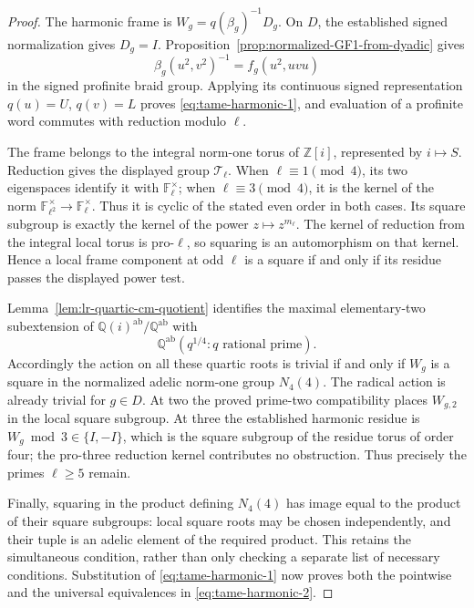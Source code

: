 \begin{proof}
The harmonic frame is $W_g=q(\beta_g)^{-1}D_g$.
On $D$, the established signed normalization gives $D_g=I$.
Proposition~\ref{prop:normalized-GF1-from-dyadic} gives
\[
 \beta_g(u^2,v^2)^{-1}=f_g(u^2,uvu)
\]
in the signed profinite braid group. Applying its continuous
signed representation $q(u)=U$, $q(v)=L$ proves \eqref{eq:tame-harmonic-1}, and
evaluation of a profinite word commutes with reduction modulo
$\ell$.

The frame belongs to the integral norm-one torus of
$\mathbb Z[i]$, represented by $i\mapsto S$.
Reduction gives the displayed group $\mathcal T_\ell$.
When $\ell\equiv1\pmod4$, its two eigenspaces identify it
with $\mathbb F_\ell^\times$; when $\ell\equiv3\pmod4$,
it is the kernel of the norm
$\mathbb F_{\ell^2}^\times\to\mathbb F_\ell^\times$.
Thus it is cyclic of the stated even order in both cases.
Its square subgroup is exactly the kernel of the power
$z\mapsto z^{m_\ell}$. The kernel of reduction from the
integral local torus is pro-$\ell$, so squaring is an
automorphism on that kernel. Hence a local frame component
at odd $\ell$ is a square if and only if its residue passes
the displayed power test.

Lemma~\ref{lem:lr-quartic-cm-quotient} identifies the
maximal elementary-two subextension of
$\mathbb Q(i)^{\mathrm{ab}}/\mathbb Q^{\mathrm{ab}}$
with
\[
 \mathbb Q^{\mathrm{ab}}(q^{1/4}:q\text{ rational prime}).
\]
Accordingly the action on all these quartic roots is trivial
if and only if $W_g$ is a square in the normalized adelic norm-one
group $N_4(4)$. The radical action is already trivial for $g\in D$.
At two the proved prime-two compatibility places $W_{g,2}$
in the local square subgroup. At three the established
harmonic residue is $W_g\bmod3\in\{I,-I\}$, which is
the square subgroup of the residue torus of order four;
the pro-three reduction kernel contributes no obstruction.
Thus precisely the primes $\ell\ge5$ remain.

Finally, squaring in the product defining $N_4(4)$ has image
equal to the product of their square subgroups: local square
roots may be chosen independently, and their tuple is an
adelic element of the required product. This retains the
simultaneous condition, rather than only checking a separate
list of necessary conditions. Substitution of \eqref{eq:tame-harmonic-1} now proves
both the pointwise and the universal equivalences in \eqref{eq:tame-harmonic-2}.
\end{proof}
